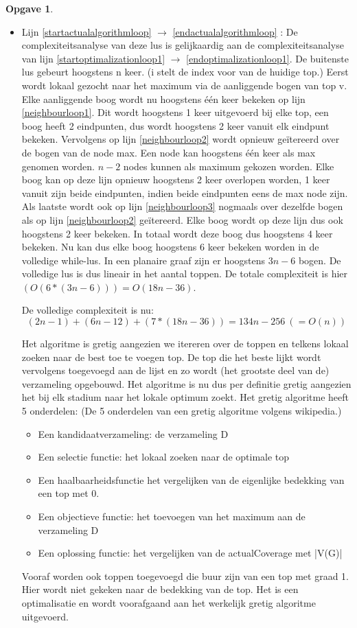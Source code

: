 \documentclass[11pt, a4paper, table]{article}
\theoremstyle{definition}
\newtheorem{opgave}{Opgave}
\begin{document}
\begin{opgave}
\begin{itemize}
			\item Lijn \ref{startactualalgorithmloop} $\rightarrow$ \ref{endactualalgorithmloop} : De complexiteitsanalyse van deze lus is gelijkaardig aan de complexiteitsanalyse van lijn \ref{startoptimalizationloop1} $\rightarrow$ \ref{endoptimalizationloop1}. De buitenste lus gebeurt hoogstens n keer. (i stelt de index voor van de huidige top.) Eerst wordt lokaal gezocht naar het maximum via de aanliggende bogen van top v. Elke aanliggende boog wordt nu hoogstens \'{e}\'{e}n keer bekeken op lijn \ref{neighbourloop1}. Dit wordt hoogstens 1 keer uitgevoerd bij elke top, een boog heeft 2 eindpunten, dus wordt hoogstens 2 keer vanuit elk eindpunt bekeken. Vervolgens op lijn \ref{neighbourloop2} wordt opnieuw ge\"{i}tereerd over de bogen van de node max. Een node kan hoogstens \'{e}\'{e}n keer als max genomen worden. $n-2$ nodes kunnen als maximum gekozen worden. Elke boog kan op deze lijn opnieuw hoogstens 2 keer overlopen worden, 1 keer vanuit zijn beide eindpunten, indien beide eindpunten eens de max node zijn. Als laatste wordt ook op lijn \ref{neighbourloop3} nogmaals over dezelfde bogen als op lijn \ref{neighbourloop2} ge\"{i}tereerd. Elke boog wordt op deze lijn dus ook hoogstens 2 keer bekeken. In totaal wordt deze boog dus hoogstens 4 keer bekeken. Nu kan dus elke boog hoogstens 6 keer bekeken worden in de volledige while-lus. In een planaire graaf zijn er hoogstens $3n-6$ bogen. De volledige lus is dus lineair in het aantal toppen. De totale complexiteit is hier $(O(6*(3n-6)))=O(18n-36)$.
		
		
		De volledige complexiteit is nu: 
		\[(2n-1)+(6n-12)+(7*(18n-36))=134n-256\ (=O(n))\]
		
			Het algoritme is gretig aangezien we itereren over de toppen en telkens lokaal zoeken naar de best toe te voegen top. De top die het beste lijkt wordt vervolgens toegevoegd aan de lijst en zo wordt (het grootste deel van de) verzameling opgebouwd. Het algoritme is nu dus per definitie gretig aangezien het bij elk stadium naar het lokale optimum zoekt.
			Het gretig algoritme heeft 5 onderdelen: (De 5 onderdelen van een gretig algoritme volgens wikipedia.)
			\begin{itemize}
				\item Een kandidaatverzameling: de verzameling D
				\item Een selectie functie: het lokaal zoeken naar de optimale top
				\item Een haalbaarheidsfunctie het vergelijken van de eigenlijke bedekking van een top met 0. 
				\item Een objectieve functie: het toevoegen van het maximum aan de verzameling D
				\item Een oplossing functie: het vergelijken van de actualCoverage met |V(G)|
			\end{itemize} 
			 Vooraf worden ook toppen toegevoegd die buur zijn van een top met graad 1. Hier wordt niet gekeken naar de bedekking van de top. Het is een optimalisatie en wordt voorafgaand aan het werkelijk gretig algoritme uitgevoerd. 
		\end{itemize}
\end{opgave}
\end{document}
